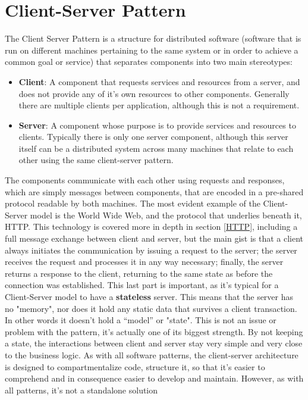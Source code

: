 \section{Client-Server Pattern} \label{clientserverpattern}
The Client Server Pattern is a structure for distributed software (software that is run on different machines pertaining to 
the same system or in order to achieve a common goal or service) that separates components into two main stereotypes:
\begin{itemize}
	\item \textbf{Client}: A component that requests services and resources from a server, and does not provide any of it's 
	own resources to other components. Generally there are multiple clients per application, although this is not a 
	requirement.
	\item \textbf{Server}: A component whose purpose is to provide services and resources to clients. Typically there is only 
	one server component, although this server itself can be a distributed system across many machines that relate to each 
	other using the same client-server pattern.
\end{itemize}
The components communicate with each other using requests and responses, which are simply messages between components, that 
are encoded in a pre-shared protocol readable by both machines. The most evident example of the Client-Server model is the 
World Wide Web, and the protocol that underlies beneath it, HTTP. This technology is covered more in depth in section \ref{HTTP}, including a full message exchange between client and server, but the main gist is that a client always initiates the 
communication by issuing a request to the server; the server receives the request and processes it in any way necessary; 
finally, the server returns a response to the client, returning to the same state as before the connection was established. 
This last part is important, as it's typical for a Client-Server model to have a \textbf{stateless} server. This means that 
the server has no "memory", nor does it hold any static data that survives a client transaction. In other words it doesn't 
hold a ``model'' or "state". This is not an issue or problem with the pattern, it's actually one of its biggest strength. By 
not keeping a state, the interactions between client and server stay very simple and very close to the business logic. As with 
all software patterns, the client-server architecture is designed to compartmentalize code, structure it, so that it's easier 
to comprehend and in consequence easier to develop and maintain. However, as with all patterns, it's not a standalone solution 
